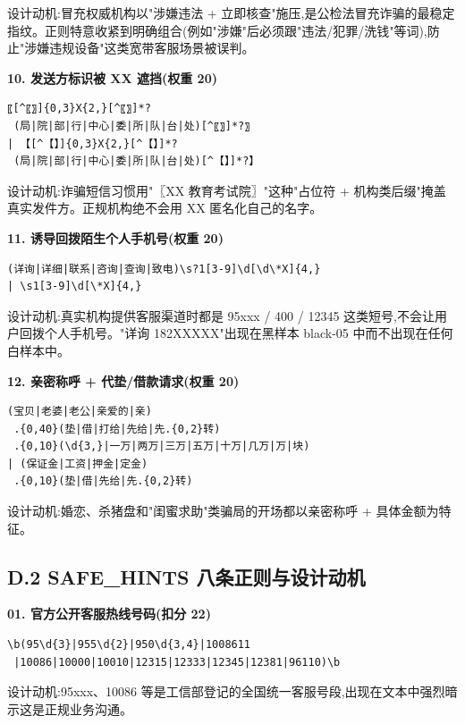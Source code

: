 \documentclass[UTF8,a4paper,12pt]{ctexart}
\begin{document}
设计动机:冒充权威机构以"涉嫌违法 + 立即核查"施压,是公检法冒充诈骗的最稳定指纹。正则特意收紧到明确组合(例如"涉嫌"后必须跟"违法/犯罪/洗钱"等词),防止"涉嫌违规设备"这类宽带客服场景被误判。

\textbf{10. 发送方标识被 XX 遮挡(权重 20)}

\begin{lstlisting}[language={}]
〖[^〖〗]{0,3}X{2,}[^〖〗]*?
 (局|院|部|行|中心|委|所|队|台|处)[^〖〗]*?〗
| 【[^【】]{0,3}X{2,}[^【】]*?
 (局|院|部|行|中心|委|所|队|台|处)[^【】]*?】
\end{lstlisting}

设计动机:诈骗短信习惯用"〖XX 教育考试院〗"这种"占位符 + 机构类后缀"掩盖真实发件方。正规机构绝不会用 XX 匿名化自己的名字。

\textbf{11. 诱导回拨陌生个人手机号(权重 20)}

\begin{lstlisting}[language={}]
(详询|详细|联系|咨询|查询|致电)\s?1[3-9]\d[\d\*X]{4,}
| \s1[3-9]\d[\*X]{4,}
\end{lstlisting}

设计动机:真实机构提供客服渠道时都是 95xxx / 400 / 12345 这类短号,不会让用户回拨个人手机号。"详询 182XXXXX"出现在黑样本 black-05 中而不出现在任何白样本中。

\textbf{12. 亲密称呼 + 代垫/借款请求(权重 20)}

\begin{lstlisting}[language={}]
(宝贝|老婆|老公|亲爱的|亲)
 .{0,40}(垫|借|打给|先给|先.{0,2}转)
 .{0,10}(\d{3,}|一万|两万|三万|五万|十万|几万|万|块)
| (保证金|工资|押金|定金)
 .{0,10}(垫|借|先给|先.{0,2}转)
\end{lstlisting}

设计动机:婚恋、杀猪盘和"闺蜜求助"类骗局的开场都以亲密称呼 + 具体金额为特征。

\subsection*{D.2 SAFE\_HINTS 八条正则与设计动机}

\textbf{01. 官方公开客服热线号码(扣分 22)}

\begin{lstlisting}[language={}]
\b(95\d{3}|955\d{2}|950\d{3,4}|1008611
 |10086|10000|10010|12315|12333|12345|12381|96110)\b
\end{lstlisting}

设计动机:95xxx、10086 等是工信部登记的全国统一客服号段,出现在文本中强烈暗示这是正规业务沟通。
\end{document}
